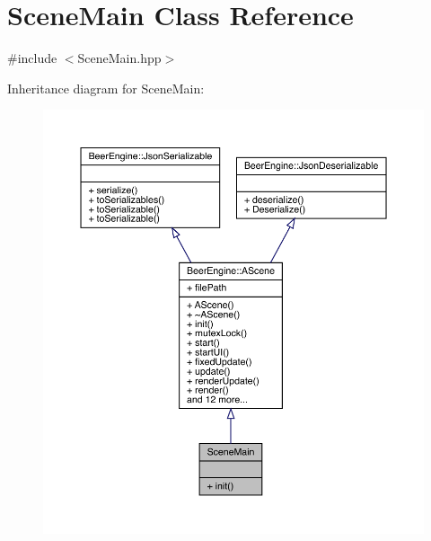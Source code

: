 \hypertarget{class_scene_main}{}\section{Scene\+Main Class Reference}
\label{class_scene_main}


{\ttfamily \#include $<$Scene\+Main.\+hpp$>$}



Inheritance diagram for Scene\+Main\+:\nopagebreak
\begin{figure}[H]
\begin{center}
\leavevmode
\includegraphics[width=350pt]{class_scene_main__inherit__graph}
\end{center}
\end{figure}


